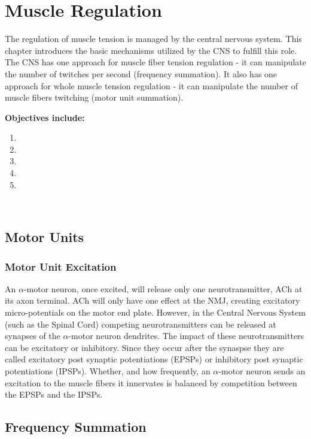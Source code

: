 \chapter{Muscle Regulation}\label{chp:regulation}

\minitoc
The regulation of muscle tension is managed by the central nervous system. This chapter introduces the basic mechanisms utilized by the CNS to fulfill this role. The CNS has one approach for muscle fiber tension regulation - it can manipulate the number of twitches per second (frequency summation). It also has one approach for whole muscle tension regulation - it can manipulate the number of muscle fibers twitching (motor unit summation). 

\vspace{5mm}

\textbf{Objectives include:}
\begin{enumerate}
    \item
    \item
    \item
    \item
    \item
\end{enumerate}\

\section{Motor Units}

\subsection{Motor Unit Excitation}

An $\alpha$-motor neuron, once excited, will release only one neurotransmitter, ACh at its axon terminal. ACh will only have one effect at the NMJ, creating excitatory micro-potentials on the motor end plate. However, in the Central Nervous System (such as the Spinal Cord) competing neurotransmitters can be released at synapses of the $\alpha$-motor neuron dendrites. The impact of these neurotransmitters can be excitatory or inhibitory. Since they occur after the synaspse they are called excitatory post synaptic potentiations (EPSPs) or inhibitory post synaptic potentiations (IPSPs). Whether, and how frequently, an $\alpha$-motor neuron sends an excitation to the muscle fibers it innervates is balanced by competition between the EPSPs and the IPSPs.

\section{Frequency Summation}

